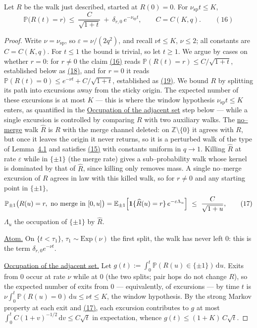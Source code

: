 \documentclass[11pt]{article}
\theoremstyle{plain}
\theoremstyle{definition}
\theoremstyle{remark}
\newcommand{\Z}{\mathbb{Z}}\newcommand{\R}{\mathbb{R}}\newcommand{\N}{\mathbb{N}}
\newcommand{\E}{\mathbb{E}}\newcommand{\PP}{\mathbb{P}}\newcommand{\dd}{\,\mathrm{d}}
\newcommand{\eps}{\varepsilon}\newcommand{\Exp}{\mathrm{Exp}}
\begin{document}
Let $R$ be the walk just described, started at $R(0)=0$. For $\nu_{\mathrm{sp}}t\le K$,
\label{eq_Rbound}
\begin{equation}
  \PP\big(R(t)=r\big)\ \le\ \frac{C}{\sqrt{1+t}}\ +\ \delta_{r,0}\,e^{-\nu_{\mathrm{sp}}t},
  \qquad C=C(K,q).\qquad(16)
\end{equation}
\par
\begin{proof}
Write $\nu=\nu_{\mathrm{sp}}$, so $\eps=\nu/(2q^2)$, and recall $\nu t\le K$,
$\nu\le2$; all constants are $C=C(K,q)$. For $t\le1$ the bound is trivial, so let
$t\ge1$. We argue by cases on whether $r=0$: for $r\ne0$ the claim \hyperref[eq_Rbound]{(16)}
reads $\PP(R(t)=r)\le C/\sqrt{1+t}$, established below as \hyperref[eq_Roff]{(18)}, and for
$r=0$ it reads $\PP(R(t)=0)\le e^{-\nu t}+C/\sqrt{1+t}$, established as
\hyperref[eq_Rzero]{(19)}. We bound $R$ by splitting its path into excursions away from the sticky origin. The
expected number of these excursions is at most $K$ --- this is where the window
hypothesis $\nu_{\mathrm{sp}}t\le K$ enters, as quantified in the \underline{Occupation
of the adjacent set} step below --- while a single excursion is controlled by comparing
$R$ with two auxiliary walks. The \underline{no--merge}
walk $\widehat R$ is $R$ with the merge channel deleted: on $\Z\setminus\{0\}$ it agrees
with $R$, but once it leaves the origin it never returns, so it is a perturbed walk of
the type of Lemma~\hyperref[lem_free]{4.1} and satisfies \hyperref[eq_tildeR]{(15)} with constants uniform
in $q\to1$. Killing $\widehat R$ at rate $\eps$ while in $\{\pm1\}$ (the merge rate)
gives a sub--probability walk whose kernel is dominated by that of $\widehat R$, since
killing only removes mass. A single no--merge excursion of $R$ agrees in law with this
killed walk, so for $r\ne0$ and any starting point in $\{\pm1\}$,
\label{eq_killdom}
\begin{equation}
  \PP_{\pm1}\big(R(u)=r,\ \text{no merge in }[0,u]\big)
  =\E_{\pm1}\Big[\bone\{\widehat R(u)=r\}\,e^{-\eps\Lambda_u}\Big]
  \ \le\ \frac{C}{\sqrt{1+u}},\qquad(17)
\end{equation}
$\Lambda_u$ the occupation of $\{\pm1\}$ by $\widehat R$.

\underline{Atom.} On $\{t<\tau_1\}$, $\tau_1\sim\Exp(\nu)$ the first split, the walk has
never left $0$: this is the term $\delta_{r,0}e^{-\nu t}$.

\underline{Occupation of the adjacent set.} Let
$g(t):=\int_0^t\PP(R(u)\in\{\pm1\})\dd u$. Exits from $0$ occur at rate $\nu$ while at
$0$ (the two splits; pair hops do not change $R$), so the expected number of exits from
$0$ --- equivalently, of excursions --- by time $t$ is
$\nu\int_0^t\PP(R(u)=0)\dd u\le\nu t\le K$, the window hypothesis. By the strong Markov property
at each exit and \hyperref[eq_killdom]{(17)}, each excursion contributes to $g$ at most
$\int_0^tC(1+v)^{-1/2}\dd v\le C\sqrt t$ in expectation, whence
$g(t)\le(1+K)\,C\sqrt t$.


\end{proof}
\end{document}
